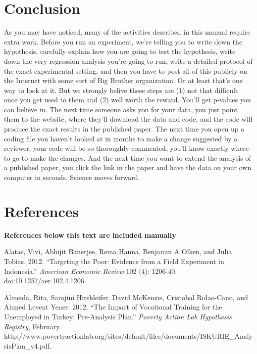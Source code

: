 \documentclass[12pt] {article}
\begin{document}
\section{Conclusion}\label{conclusion}

As you may have noticed, many of the activities described in this manual
require extra work. Before you run an experiment, we're telling you to
write down the hypothesis, carefully explain how you are going to test
the hypothesis, write down the very regression analysis you're going to
run, write a detailed protocol of the exact experimental setting, and
then you have to post all of this publicly on the Internet with some
sort of Big Brother organization. Or at least that's one way to look at
it. But we strongly belive these steps are (1) not that difficult once
you get used to them and (2) well worth the reward. You'll get p-values
you can believe in. The next time someone asks you for your data, you
just point them to the website, where they'll download the data and
code, and the code will produce the exact results in the published
paper. The next time you open up a coding file you haven't looked at in
months to make a change suggested by a reviewer, your code will be so
thoroughly commented, you'll know exactly where to go to make the
changes. And the next time you want to extend the analysis of a
published paper, you click the link in the paper and have the data on
your own computer in seconds. Science moves forward.

\section{References}\label{references}



\textbf{References below this text are included manually}

Alatas, Vivi, Abhijit Banerjee, Rema Hanna, Benjamin A Olken, and Julia
Tobias. 2012. ``Targeting the Poor: Evidence from a Field Experiment in
Indonesia.'' \emph{American Economic Review} 102 (4): 1206-40.
doi:10.1257/aer.102.4.1206.

Almeida, Rita, Sarojini Hirshleifer, David McKenzie, Cristobal
Ridao-Cano, and Ahmed Levent Yener. 2012. ``The Impact of Vocational
Training for the Unemployed in Turkey: Pre-Analysis Plan.''
\emph{Poverty Action Lab Hypothesis Registry}, February.
http://www.povertyactionlab.org/sites/default/files/documents/ISKURIE\_AnalysisPlan\_v4.pdf.
\end{document}
